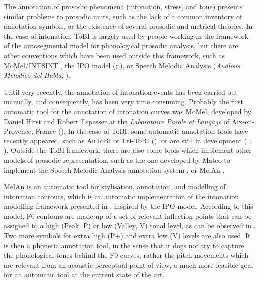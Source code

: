 \documentclass[output=paper]{langsci/langscibook}
\begin{document}
The annotation of prosodic phenomena (intonation, stress, and tone) presents similar problems to prosodic units, such as the lack of a common inventory of annotation symbols, or the existence of several prosodic and metrical theories. In the case of intonation, ToBI \citep{Silverman1992} is largely used by people working in the framework of the autosegmental model for phonological prosodic analysis, but there are other conventions which have been used outside this framework, such as MoMel/INTSINT \citep{Hirst2000}, the IPO model (\citealt{Hart.1990}; \citealt{Garrido1996}), or Speech Melodic Analysis (\textit{Análisis Melódico del Habla}, \citealt{Cantero2009}).

Until very recently, the annotation of intonation events has been carried out manually, and consequently, has been very time consuming. Probably the first automatic tool for the annotation of intonation curves was MoMel, developed by Daniel Hirst and Robert Espesser at the \textit{Laboratoire Parole et Langage} of Aix-en-Provence, France (\citealt{Hirst1993}). 
In the case of ToBI, some automatic annotation tools have recently appeared, such as AuToBI \citep{Rosenberg2010} 
or Eti-ToBI (\citealt{ElviraGarcia2015}), or are still in development (\citeauthor{Escudero2014a} \citeyear*{Escudero2014a,Escudero2014b,Escudero2014c}; \citealt{Gonzalez2014}). 
Outside the ToBI framework, there are also some tools which implement other models of prosodic representation, such as the one developed by Mateo to implement the Speech Melodic Analysis annotation system \citep{MateoRuiz.2010protocolo,MateoRuiz.2010Scripts}, or MelAn \citep{Garrido2010}.

MelAn is an automatic tool for stylisation, annotation, and modelling of intonation contours, which is an automatic implementation of the intonation modelling framework presented in \citep{Garrido1996,Garrido2001}, inspired by the IPO model. According to this model, F0 contours are made up of a set of relevant inflection points that can be assigned to a high (Peak, P) or low (Valley, V) tonal level, as can be observed in . Two more symbols for extra high (P+) and extra low (V\textminus) levels are also used. It is then a phonetic annotation tool, in the sense that it does not try to capture the phonological tones behind the F0 curves, rather the pitch movements which are relevant from an acoustic-perceptual point of view, a much more feasible goal for an automatic tool at the current state of the art.\largerpage[-2]
\end{document}
